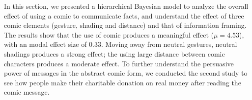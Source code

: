 
In this section, we presented a hierarchical Bayesian model to analyze the overall effect of using a comic to communicate facts, and understand the effect of three comic elements (gesture, shading and distance) and that of information framing. The results show that the use of comic produces a meaningful effect ($\mu=4.53$), with an modal effect size of $0.33$. Moving away from neutral gestures, neutral shadings produces a strong effect; the using large distance between comic characters produces a moderate effect. To further understand the persuasive power of messages in the abstract comic form, we conducted the second study to see how people make their charitable donation on real money after reading the comic message.  
